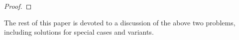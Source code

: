\begin{proof}
\end{proof}

The rest of this paper is devoted to a discussion of the above two problems, including solutions for special cases and variants.